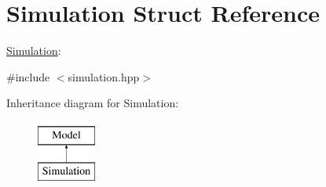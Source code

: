 \hypertarget{structSimulation}{}\section{Simulation Struct Reference}
\label{structSimulation}


\mbox{\hyperlink{structSimulation}{Simulation}}\+:  




{\ttfamily \#include $<$simulation.\+hpp$>$}

Inheritance diagram for Simulation\+:\begin{figure}[H]
\begin{center}
\leavevmode
\includegraphics[height=2.000000cm]{structSimulation}
\end{center}
\end{figure}
